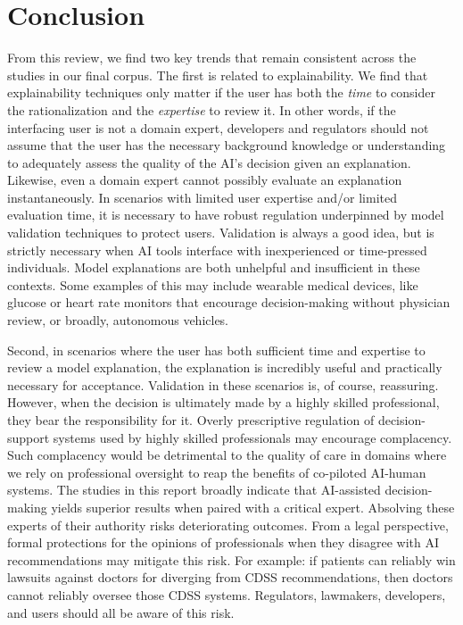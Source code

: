 \documentclass[authoryear,preprint,12pt]{elsarticle}
\begin{document}
\section{Conclusion}
\label{sec:conclusion}
From this review, we find two key trends that remain consistent across the
studies in our final corpus. The first is related to explainability. We find
that explainability techniques only matter if the user has both the
\textit{time} to consider the rationalization and the \textit{expertise} to
review it. In other words, if the interfacing user is not a domain expert,
developers and regulators should not assume that the user has the necessary
background knowledge or understanding to adequately assess the quality of the
AI's decision given an explanation. Likewise, even a domain expert cannot
possibly evaluate an explanation instantaneously. In scenarios with limited user
expertise and/or limited evaluation time, it is necessary to have robust
regulation underpinned by model validation techniques to protect users.
Validation is always a good idea, but is strictly necessary when AI tools
interface with inexperienced or time-pressed individuals. Model explanations are
both unhelpful and insufficient in these contexts. Some examples of this may
include wearable medical devices, like glucose or heart rate monitors that
encourage decision-making without physician review, or broadly, autonomous
vehicles.

Second, in scenarios where the user has both sufficient time and expertise to
review a model explanation, the explanation is incredibly useful and practically
necessary for acceptance. Validation in these scenarios is, of course,
reassuring. However, when the decision is ultimately made by a highly skilled
professional, they bear the responsibility for it. Overly prescriptive
regulation of decision-support systems used by highly skilled professionals may
encourage complacency. Such complacency would be detrimental to the quality of
care in domains where we rely on professional oversight to reap the benefits of
co-piloted AI-human systems. The studies in this report broadly indicate that
AI-assisted decision-making yields superior results when paired with a critical
expert. Absolving these experts of their authority risks deteriorating
outcomes. From a legal perspective, formal protections for the opinions of
professionals when they disagree with AI recommendations may mitigate this risk.
For example: if patients can reliably win lawsuits against doctors for diverging
from CDSS recommendations, then doctors cannot reliably oversee those CDSS
systems. Regulators, lawmakers, developers, and users should all be aware of
this risk.
\end{document}
